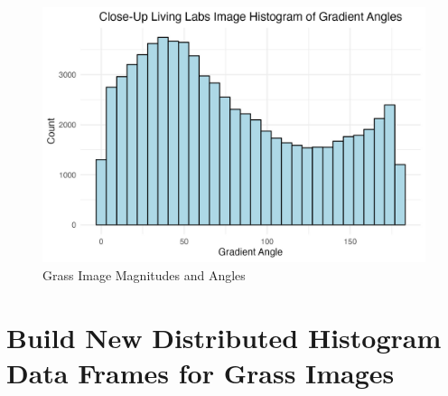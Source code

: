 \documentclass[
  letterpaper,
  DIV=11,
  numbers=noendperiod]{scrreprt}
\begin{document}
\begin{figure}
\begin{minipage}{0.33\linewidth}
\includegraphics{images/plots/grass/close_up_living_lab_histogram_theta_plot.jpg}\end{minipage}%

\caption{\label{fig-grass-histograms}Grass Image Magnitudes and Angles}

\end{figure}%

\section{Build New Distributed Histogram Data Frames for Grass
Images}\label{build-new-distributed-histogram-data-frames-for-grass-images}
\end{document}
